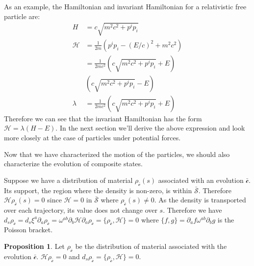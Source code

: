 \documentclass[aps,pra,10pt,twocolumn,floatfix,nofootinbib]{revtex4-1}
\numberwithin{equation}{section}
\theoremstyle{definition}
\newtheorem{prop}[equation]{Proposition}
\begin{document}
As an example, the Hamiltonian and invariant Hamiltonian for a relativistic free particle are:
\begin{equation}\label{free_hamiltonians}
\begin{aligned}
H &= c \sqrt{m^2 c^2 + p^i p_i} \\
\mathcal{H} &= \frac{1}{2m} ( p^i p_i - (E/c)^2 + m^2c^2) \\
 &= \frac{1}{2mc^2} (c \sqrt{m^2 c^2 + p^i p_i} + E) \\
 &(c \sqrt{m^2 c^2 + p^i p_i} - E) \\
\lambda &= \frac{1}{2mc^2} (c \sqrt{m^2 c^2 + p^i p_i} + E)
\end{aligned}
\end{equation}
Therefore we can see that the invariant Hamiltonian has the form $\mathcal{H}=\lambda (H - E)$. In the next section we'll derive the above expression and look more closely at the case of particles under potential forces.

Now that we have characterized the motion of the particles, we should also characterize the evolution of composite states.

Suppose we have a distribution of material $\rho_{\bar{\mathcal{c}}}(s)$ associated with an evolution $\bar{\mathcal{c}}$. Its support, the region where the density is non-zero, is within $\bar{\mathcal{S}}$. Therefore  $\mathcal{H} \rho_{\bar{\mathcal{c}}}(s) = 0$ since $\mathcal{H} = 0$ in $\bar{\mathcal{S}}$ where $\rho_{\bar{\mathcal{c}}}(s) \neq 0$. As the density is transported over each trajectory, its value does not change over $s$. Therefore we have $d_s \rho_{\bar{\mathcal{c}}}= d_s \xi^a \partial_a \rho_{\bar{\mathcal{c}}} = \omega^{ab} \partial_b \mathcal{H} \partial_a \rho_{\bar{\mathcal{c}}} = \{ \rho_{\bar{\mathcal{c}}}, \mathcal{H} \} = 0$ where $\{f , g\} = \partial_a f \omega^{ab} \partial_b g$ is the Poisson bracket.

\begin{prop}\label{relativistic_distribution_evolution}
	Let $\rho_{\bar{\mathcal{c}}}$ be the distribution of material associated with the evolution $\bar{\mathcal{c}}$. $\mathcal{H} \rho_{\bar{\mathcal{c}}} = 0$ and $d_s \rho_{\bar{\mathcal{c}}} = \{ \rho_{\bar{\mathcal{c}}}, \mathcal{H} \} = 0$.
\end{prop}
\end{document}
